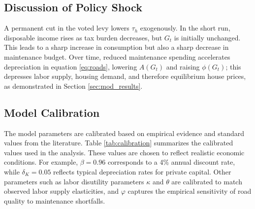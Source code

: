 \subsection{Discussion of Policy Shock}
A permanent cut in the voted levy lowers $\tau_h$ exogenously. In the short run, disposable income rises as tax burden decreases, but $G_t$ is initially unchanged. This leads to a sharp increase in consumption but also a sharp decrease in maintenance budget. Over time, reduced maintenance spending accelerates depreciation in equation \ref{eq:roads}, lowering $A(G_t)$ and raising $\phi(G_t)$; this depresses labor supply, housing demand, and therefore equilibrium house prices, as demonstrated in Section \ref{sec:mod_results}.

\subsection{Model Calibration}

The model parameters are calibrated based on empirical evidence and standard values from the literature. Table \ref{tab:calibration} summarizes the calibrated values used in the analysis. These values are chosen to reflect realistic economic conditions. For example, $\beta = 0.96$ corresponds to a 4\% annual discount rate, while $\delta_K = 0.05$ reflects typical depreciation rates for private capital. Other parameters such as labor disutility parameters $\kappa$ and $\theta$ are calibrated to match observed labor supply elasticities, and $\varphi$ captures the empirical sensitivity of road quality to maintenance shortfalls.

